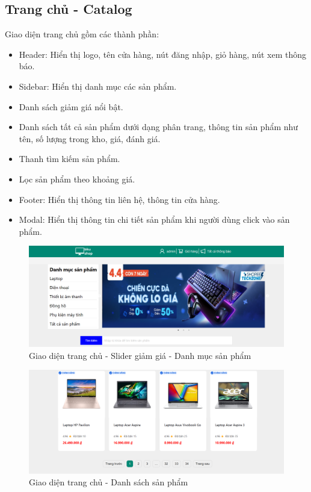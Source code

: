 \subsection{Trang chủ - Catalog}
\noindent Giao diện trang chủ gồm các thành phần:
\begin{itemize}
    \item Header: Hiển thị logo, tên cửa hàng, nút đăng nhập, giỏ hàng, nút xem thông báo.
    \item Sidebar: Hiển thị danh mục các sản phẩm.
    \item Danh sách giảm giá nổi bật.
    \item Danh sách tất cả sản phẩm dưới dạng phân trang, thông tin sản phẩm như tên, số lượng trong kho, giá, đánh giá.
    \item Thanh tìm kiếm sản phẩm.
    \item Lọc sản phẩm theo khoảng giá.
    \item Footer: Hiển thị thông tin liên hệ, thông tin cửa hàng.
    \item Modal: Hiển thị thông tin chi tiết sản phẩm khi người dùng click vào sản phẩm.
\end{itemize}
\begin{figure}[H]
    \begin{center}
    \includegraphics[scale=0.35]{images/hieu/chap-5/catalog-1.png}
    \vspace*{3mm}
    \caption{Giao diện trang chủ - Slider giảm giá - Danh mục sản phẩm}
    \end{center}
\end{figure}

\begin{figure}[H]
    \begin{center}
    \includegraphics[scale=0.35]{images/hieu/chap-5/catalog-2.png}
    \vspace*{3mm}
    \caption{Giao diện trang chủ - Danh sách sản phẩm }
    \end{center}
\end{figure}

